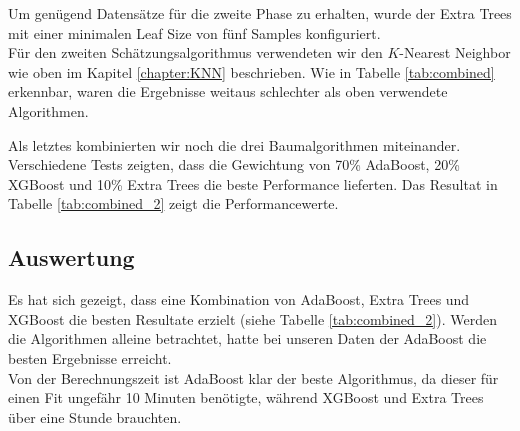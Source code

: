 Um genügend Datensätze für die zweite Phase zu erhalten, wurde der Extra Trees mit einer minimalen Leaf Size von fünf Samples konfiguriert.\\
Für den zweiten Schätzungsalgorithmus verwendeten wir den $K$-Nearest Neighbor wie oben im Kapitel \ref{chapter:KNN} beschrieben. Wie in Tabelle \ref{tab:combined} erkennbar, waren die Ergebnisse weitaus schlechter als oben verwendete Algorithmen.

\begin{table}[ht]
\centering
{}
\caption{Ergebnisse des selbst entwickelten Algorithmus}
\label{tab:combined}
\end{table}

Als letztes kombinierten wir noch die drei Baumalgorithmen miteinander. Verschiedene Tests zeigten, dass die Gewichtung von 70\% AdaBoost, 20\% XGBoost und 10\% Extra Trees die beste Performance lieferten.
Das Resultat in Tabelle \ref{tab:combined_2} zeigt die Performancewerte.

\begin{table}[ht]
\centering
{}
\caption{Kombination von AdaBoost, XGBoost und Extra Trees}
\label{tab:combined_2}
\end{table}

\subsection{Auswertung}
Es hat sich gezeigt, dass eine Kombination von AdaBoost, Extra Trees und XGBoost die besten Resultate erzielt (siehe Tabelle \ref{tab:combined_2}). Werden die Algorithmen alleine betrachtet, hatte bei unseren Daten der AdaBoost die besten Ergebnisse erreicht.\\
Von der Berechnungszeit ist AdaBoost klar der beste Algorithmus, da dieser für einen Fit ungefähr 10 Minuten benötigte, während XGBoost und Extra Trees über eine Stunde brauchten.

